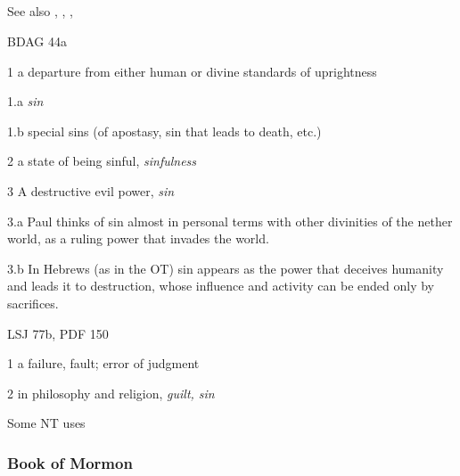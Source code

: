 			\subparagraph{\texorpdfstring{}{}}
				\label{HAMARTIA}
				
				See also \hyperref[PARABASIS]{}, \hyperref[ANOMIA]{}, \hyperref[ADIKIA]{}, 
			
				\begin{compactdesc}
					\item[BDAG 44a] \textbf{}
						\begin{compactitem}
							\item[1] a departure from either human or divine standards of uprightness
							\item[1.a] \textit{sin}
							\item[1.b] special sins (of apostasy, sin that leads to death, etc.)
							\item[2] a state of being sinful, \textit{sinfulness}
							\item[3] A destructive evil power, \textit{sin}
							\item[3.a] Paul thinks of sin almost in personal terms with other divinities of the nether world, as a ruling power that invades the world.
							\item[3.b] In Hebrews (as in the OT) sin appears as the power that deceives humanity and leads it to destruction, whose influence and activity can be ended only by sacrifices.
						\end{compactitem}
					\item[LSJ 77b, PDF 150] \textbf{}
						\begin{compactitem}
							\item[1] a failure, fault; error of judgment
							\item[2] in philosophy and religion, \textit{guilt, sin}
						\end{compactitem}
				\end{compactdesc}
				
				\begin{compactdesc}
					\item[Some NT uses] \textbf{}
						\begin{compactdesc}
							\item[]
						\end{compactdesc}
				\end{compactdesc}
		
	\subsubsection{Book of Mormon} %
		\label{SIN-BOM}
	
